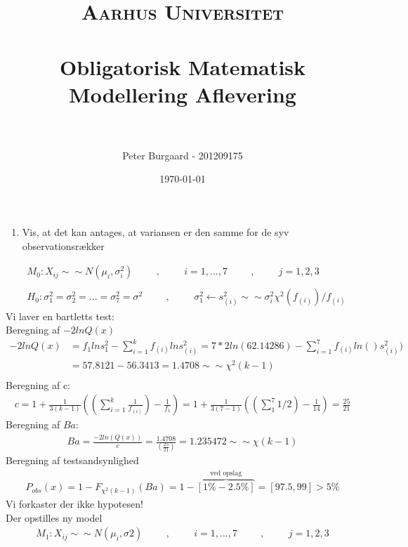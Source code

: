 \documentclass[paper=a4, fontsize=11pt]{scrartcl} %
\title{	
	\normalfont \normalsize 
	\textsc{Aarhus Universitet} \\ [25pt] %
	\horrule{0.5pt} \\[0.4cm] %
	\huge Obligatorisk Matematisk Modellering Aflevering \\ %
	\horrule{2pt} \\[0.5cm] %
}
\author{Peter Burgaard - 201209175} %
\date{\normalsize\today} %
\numberwithin{equation}{section} %
\numberwithin{figure}{section} %
\numberwithin{table}{section} %
\begin{document}
	
	\maketitle %
	
	\begin{enumerate}
		\item Vis, at det kan antages, at variansen er den samme for de syv observationsrækker
	\end{enumerate}
	\begin{align*}
	& M_0: X_{ij} \sim\sim N(\mu_i,\sigma_i^2) \hspace{1cm},\hspace{1cm} i=1, ... , 7\hspace{1cm},\hspace{1cm} j=1,2,3	\\ \\
	& H_0: \sigma_1^2=\sigma_2^2= ... =\sigma_7^2=\sigma^2	\hspace{1cm},\hspace{1cm} \sigma_1^2\leftarrow s^2_{(i)} \sim\sim\sigma_i^2\chi^2(f_{(i)})/f_{(i)} 
	\end{align*}
	Vi laver en bartletts test: \\ 
	Beregning af $-2lnQ(x)$
	\begin{align*}
	 -2lnQ(x) &=f_1lns^2_1-\sum_{i=1}^{k}f_{(i)}lns^2_{(i)}=7*2ln(62.14286)-\sum_{i=1}^{7}f_(i)ln()s^2_{(i)}) \\
	 &=57.8121-56.3413=1.4708\sim\sim\chi^2(k-1) \\
	\end{align*}
	Beregning af c:
	\begin{align*}
	c=1+\frac{1}{3(k-1)}((\sum_{i=1}^{k}\frac{1}{f_{(i)}})-\frac{1}{f_1})=1+\frac{1}{3(7-1)}((\sum_{1}^{7}1/2)-\frac{1}{14})=\frac{25}{21}
	\end{align*}
	Beregning af $Ba$:
	\begin{align*}
	Ba=\frac{-2ln(Q(x))}{c}=\frac{1.4708}{(\frac{25}{21})}=1.235472\sim\sim\chi(k-1)
	\end{align*}
	Beregning af testsandsynlighed
	\begin{align*}
	P_{obs}(x)=1-F_{\chi^2(k-1)}(Ba)=1-\overbrace{\left[ 1\%-2.5\% \right] }^\text{ved opslag}=\left[97.5,99\right]>5\%
	\end{align*}
	Vi forkaster der ikke hypotesen! \\
	Der opstilles ny model
	\begin{align*}
	M_1:X_{ij}\sim\sim N(\mu_i,\sigma2) \hspace{1cm},\hspace{1cm} i=1, ... , 7\hspace{1cm},\hspace{1cm} j=1,2,3
	\end{align*}
	
\end{document}
